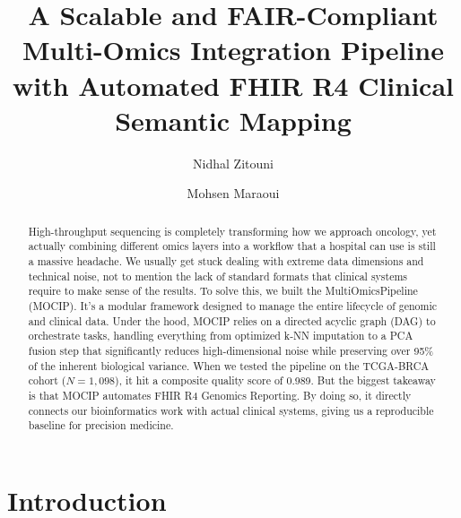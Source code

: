 \documentclass[runningheads]{llncs}
\begin{document}
\title{A Scalable and FAIR-Compliant Multi-Omics Integration Pipeline with Automated FHIR R4 Clinical Semantic Mapping}

\author{Nidhal Zitouni \and Mohsen Maraoui}

\maketitle

\begin{abstract}
High-throughput sequencing is completely transforming how we approach oncology, yet actually combining different omics layers into a workflow that a hospital can use is still a massive headache. We usually get stuck dealing with extreme data dimensions and technical noise, not to mention the lack of standard formats that clinical systems require to make sense of the results. To solve this, we built the MultiOmicsPipeline (MOCIP). It's a modular framework designed to manage the entire lifecycle of genomic and clinical data. Under the hood, MOCIP relies on a directed acyclic graph (DAG) to orchestrate tasks, handling everything from optimized k-NN imputation to a PCA fusion step that significantly reduces high-dimensional noise while preserving over 95\% of the inherent biological variance. When we tested the pipeline on the TCGA-BRCA cohort ($N=1,098$), it hit a composite quality score of 0.989. But the biggest takeaway is that MOCIP automates FHIR R4 Genomics Reporting. By doing so, it directly connects our bioinformatics work with actual clinical systems, giving us a reproducible baseline for precision medicine.

\end{abstract}


\section{Introduction}
\end{document}
